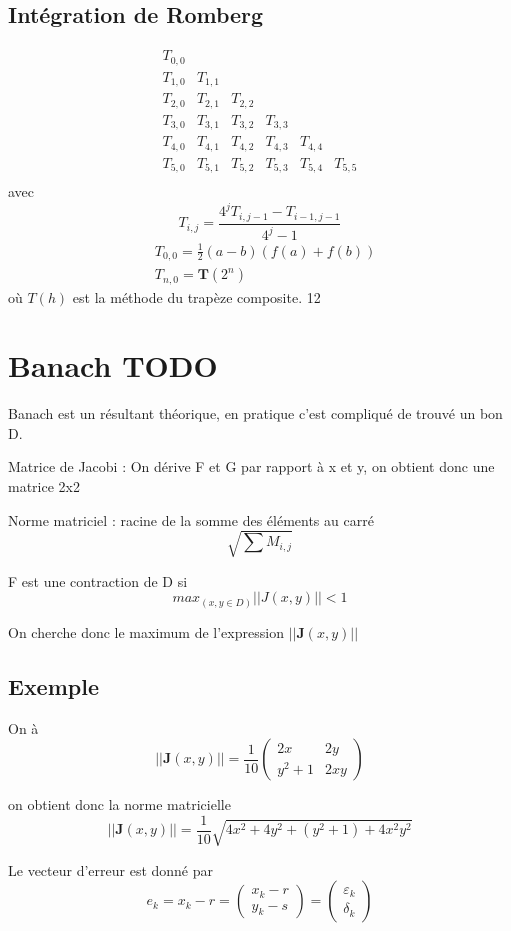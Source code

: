 \documentclass[a4paper,9pt]{extarticle}
\begin{document}
\section{Intégration de Romberg}
$$
\begin{array}{cccccc}
T_{0,0} & & & & & \\
T_{1,0} & T_{1,1} & & & & \\
T_{2,0} & T_{2,1} & T_{2,2} & & & \\
T_{3,0} & T_{3,1} & T_{3,2} & T_{3,3} & & \\
T_{4,0} & T_{4,1} & T_{4,2} & T_{4,3} & T_{4,4} & \\
T_{5,0} & T_{5,1} & T_{5,2} & T_{5,3} & T_{5,4} & T_{5,5} \\
\end{array}
$$
avec
$$
T_{i,j}=\frac{4^jT_{i,j-1}-T_{i-1,j-1}}{4^j-1}
$$
\begin{align*}
& T_{0,0}=\frac{1}{2}(a-b)(f(a)+f(b))\\
& T_{n,0}=\textbf{T}(2^n)
\end{align*}
où $T(h)$ est la méthode du trapèze composite.
12
\chapter{Banach TODO}

Banach est un résultant théorique, en pratique c'est compliqué de trouvé un bon D.

Matrice de Jacobi : On dérive F et G par rapport à x et y, on obtient donc une matrice 2x2

Norme matriciel : racine de la somme des éléments au carré
$$\sqrt{\sum{M_{i,j}}}$$

F est une contraction de D si
$$
max_{(x,y\in D)} ||J(x,y)|| < 1
$$

On cherche donc le maximum de l'expression $||\textbf{J}(x,y)||$
\section{Exemple}
On à $$||\textbf{J}(x,y)|| = \frac{1}{10}(\begin{array}{cc}
2x & 2y \\ 
y^2+1 & 2xy
\end{array})$$

on obtient donc la norme matricielle
$$
||\textbf{J}(x,y)|| = \frac{1}{10}\sqrt{4x^2+4y^2+(y^2+1)+4x^2y^2}
$$

Le vecteur d'erreur est donné par
$$
e_k = x_k - r = (\begin{array}{c}
x_k-r \\ 
y_k-s
\end{array} ) = (\begin{matrix}
\varepsilon_k \\ 
\delta_k
\end{matrix})
$$
\end{document}
